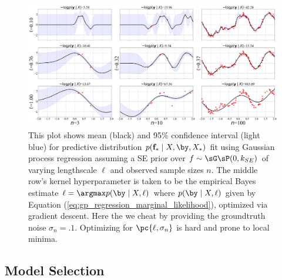 \documentclass[11pt]{article}
\begin{document}
\begin{center} 
\begin{figure}[h!]
    \includegraphics[width=\textwidth]{assets/plt_gp_regression_inference.png} 
    \caption{This plot shows mean (black) and 95\% confidence interval (light blue) for predictive distribution $p(\mathbf{f}_*\mid X,\by, X_*)$ fit using Gaussian process regression assuming a SE prior over $f\sim\sG\sP(0,k_{SE})$ of varying lengthscale $\ell$ and observed sample sizes $n$. The middle row's kernel hyperparameter is taken to be the empirical Bayes estimate $\ell = \argmax p(\by\mid X, \ell)$ where $p(\by\mid X,\ell)$ given by Equation (\ref{eq:gp_regression_marginal_likelihood}), optimized via gradient descent. Here the we cheat by providing the groundtruth noise $\sigma_n=.1$. Optimizing for $\pc{\ell,\sigma_n}$ is hard and prone to local minima.}
    \label{fig:plt_gp_regression_inference}
\end{figure}
\end{center}

\subsection{Model Selection}
\end{document}

